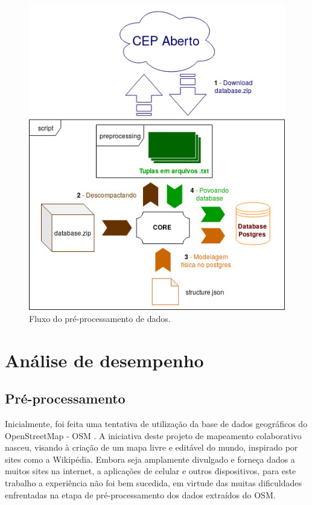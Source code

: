 \documentclass[conference]{IEEEtran}
\begin{document}
\begin{figure}[htbp]
\centerline{\includegraphics[scale=0.45]{imgs/preprocessing.jpg}}
\caption{Fluxo do pré-processamento de dados.}
\label{fig:preprocessing}
\end{figure}

\section{Análise de desempenho}
\label{sec:analise_desempenho}

\subsection{Pré-processamento}
\label{subsec:pre_processamento}
Inicialmente, foi feita uma tentativa de utilização da base de dados geográficos do OpenStreetMap - OSM \cite{OSM:2019}. A iniciativa deste projeto de mapeamento colaborativo nasceu, visando à criação de um mapa livre e editável do mundo, inspirado por sites como a Wikipédia. Embora seja amplamente divulgado e forneça dados a muitos sites na internet, a aplicações de celular e outros dispositivos, para este trabalho a experiência não foi bem sucedida, em virtude das muitas dificuldades enfrentadas na etapa de pré-processamento dos dados extraídos do OSM.
\end{document}
